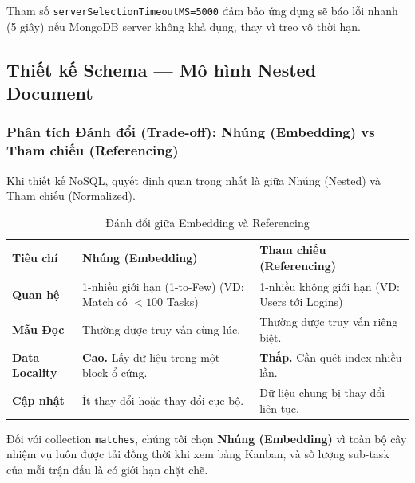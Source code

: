 \documentclass[a4paper,12pt]{article}
\begin{document}
Tham số \texttt{serverSelectionTimeoutMS=5000} đảm bảo ứng dụng sẽ báo lỗi nhanh (5 giây) nếu MongoDB server không khả dụng, thay vì treo vô thời hạn.

\subsection{Thiết kế Schema --- Mô hình Nested Document}

\subsubsection{Phân tích Đánh đổi (Trade-off): Nhúng (Embedding) vs Tham chiếu (Referencing)}
Khi thiết kế NoSQL, quyết định quan trọng nhất là giữa Nhúng (Nested) và Tham chiếu (Normalized).

\begin{table}[H]
\centering
\begin{tabular}{|l|p{6cm}|p{6cm}|}
\hline
\textbf{Tiêu chí} & \textbf{Nhúng (Embedding)} & \textbf{Tham chiếu (Referencing)} \\ \hline
\textbf{Quan hệ} & 1-nhiều giới hạn (1-to-Few) (VD: Match có $<100$ Tasks) & 1-nhiều không giới hạn (VD: Users tới Logins) \\ \hline
\textbf{Mẫu Đọc} & Thường được truy vấn cùng lúc. & Thường được truy vấn riêng biệt. \\ \hline
\textbf{Data Locality} & \textbf{Cao.} Lấy dữ liệu trong một block ổ cứng. & \textbf{Thấp.} Cần quét index nhiều lần. \\ \hline
\textbf{Cập nhật} & Ít thay đổi hoặc thay đổi cục bộ. & Dữ liệu chung bị thay đổi liên tục. \\ \hline
\end{tabular}
\caption{Đánh đổi giữa Embedding và Referencing}
\end{table}

Đối với collection \texttt{matches}, chúng tôi chọn \textbf{Nhúng (Embedding)} vì toàn bộ cây nhiệm vụ luôn được tải đồng thời khi xem bảng Kanban, và số lượng sub-task của mỗi trận đấu là có giới hạn chặt chẽ.
\end{document}
